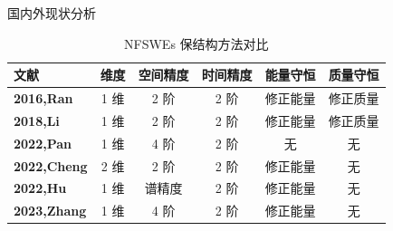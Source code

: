 \documentclass[aspectratio=169]{beamer}
\numberwithin{theorem}{section} %
\numberwithin{equation}{section}%
\numberwithin{figure}{section}%
\numberwithin{table}{section}%
\begin{document}
\begin{frame}{国内外现状分析}
	\begin{table}[htbp]
		\centering
		\small
		\caption{NFSWEs 保结构方法对比}
			\begin{tabular}{lccccc}
			\toprule
			\textcolor[rgb]{0.227,0.373,0.306}{\textbf{文献}} & \textcolor[rgb]{0.227,0.373,0.306}{\textbf{维度}} & \textcolor[rgb]{0.227,0.373,0.306}{\textbf{空间精度}} & \textcolor[rgb]{0.227,0.373,0.306}{\textbf{时间精度}} & \textcolor[rgb]{0.227,0.373,0.306}{\textbf{能量守恒}} & \textcolor[rgb]{0.227,0.373,0.306}{\textbf{质量守恒}} \\
			\midrule
			\textcolor[rgb]{0.227,0.373,0.306}{\textbf{\cite{ranLinearlyImplicitConservative2016}{2016,Ran}}} & 1 维   & 2 阶   & 2 阶   & 修正能量  & 修正质量 \\
			\midrule
			\textcolor[rgb]{0.227,0.373,0.306}{\textbf{\cite{liFastEnergyConserving2018}{2018,Li}}} & 1 维   & 2 阶   & 2 阶   & 修正能量  & 修正质量 \\
			\midrule
			\textcolor[rgb]{0.227,0.373,0.306}{\textbf{\cite{panFourthorderDifferenceScheme2022}{2022,Pan}}} & 1 维   & 4 阶   & 2 阶   & 无     & 无 \\
			\midrule
			\textcolor[rgb]{0.227,0.373,0.306}{\textbf{\cite{chengConvergenceEnergyconservingScheme2022}{2022,Cheng}}} & 2 维   & 2 阶   & 2 阶   & 修正能量  & 无 \\
			\midrule
			\textcolor[rgb]{0.227,0.373,0.306}{\textbf{\cite{huEfficientEnergyPreserving2022}{2022,Hu}}} & 1 维   & 谱精度   & 2 阶   & 修正能量  & 无 \\
			\midrule
			\textcolor[rgb]{0.227,0.373,0.306}{\textbf{\cite{zhangHighorderStructurepreservingDifference2023}{2023,Zhang}}} & 1 维   & 4 阶   & 2 阶   & 修正能量  & 无 \\
			\bottomrule
			\end{tabular}%
		\label{tab:1}%
		\end{table}%
		\end{frame}
	
\end{document}
